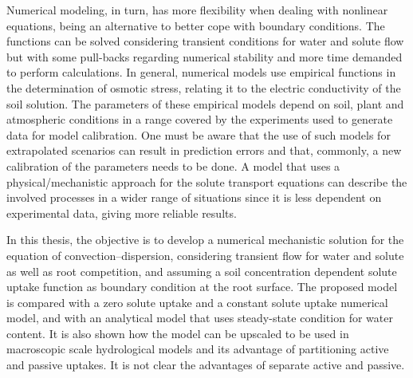 Numerical modeling, in turn, has more flexibility when dealing with nonlinear equations, being an alternative to better cope with boundary conditions. 
The functions can be solved considering transient conditions for water and solute flow but with some pull-backs regarding numerical stability and more time demanded to perform calculations.
In general, numerical models use empirical functions in the determination of osmotic stress, relating it to the electric conductivity of the soil solution. 
The parameters of these empirical models depend on soil, plant and atmospheric conditions in a range covered by the experiments used to generate data for model calibration. 
One must be aware that the use of such models for extrapolated scenarios can result in prediction errors and that, commonly, a new calibration of the parameters needs to be done.
A model that uses a physical/mechanistic approach for the solute transport equations can describe the involved processes in a wider range of situations since it is less dependent on experimental data, giving more reliable results.

In this thesis, the objective is to develop a numerical mechanistic solution for the equation of convection--dispersion, considering transient flow for water and solute as well as root competition, and assuming a soil concentration dependent solute uptake function as boundary condition at the root surface. 
The proposed model is compared with a zero solute uptake and a constant solute uptake numerical model, and with an analytical model that uses steady-state condition for water content. 
It is also shown how the model can be upscaled to be used in macroscopic scale hydrological models and its advantage of partitioning active and passive uptakes. 
{\localcolor \Red \quic It is not clear the advantages of separate active and passive.}
